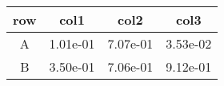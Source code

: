 \begin{tabular}{cccc}
\toprule
row&col1&col2&col3\tabularnewline
\midrule
A&1.01e-01&7.07e-01&3.53e-02\tabularnewline
B&3.50e-01&7.06e-01&9.12e-01\tabularnewline
\bottomrule
\end{tabular}
